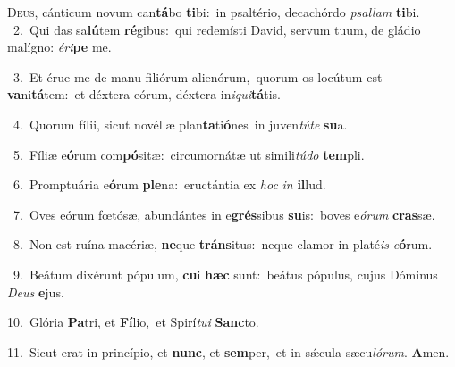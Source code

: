 \lettrine{\initial\textcolor{\initialcolor}{D}}{eus,} cánticum novum can\-\textbf{tá}\-bo \textbf{ti}\-bi:~\star in psaltério, decachórdo \textit{psal}\-\textit{lam} \textbf{ti}\-bi.\\
{\numbfont\textcolor{\numbcolor}{~2.}}~Qui das sa\-\textbf{lú}\-tem \textbf{ré}\-gibus:~\star qui redemísti David, servum tuum, de gládio malígno: \textit{é}\-\textit{ri}\textbf{pe} me.\par
{\numbfont\textcolor{\numbcolor}{~3.}}~Et érue me de manu filiórum alienórum,~\dagger quorum os locútum est \textbf{va}\-ni\-\textbf{tá}\-tem:~\star et déxtera eórum, déxtera in\-\textit{i}\-\textit{qui}\textbf{tá}tis.\par
{\numbfont\textcolor{\numbcolor}{~4.}}~Quorum fílii, sicut novéllæ plan\-\textbf{ta}\-ti\-\textbf{ó}\-nes~\star in juven\-\textit{tú}\-\textit{te} \textbf{su}\-a.\par
{\numbfont\textcolor{\numbcolor}{~5.}}~Fíliæ e\-\textbf{ó}\-rum com\-\textbf{pó}\-sitæ:~\star circumornátæ ut simili\-\textit{tú}\-\textit{do} \textbf{tem}\-pli.\par
{\numbfont\textcolor{\numbcolor}{~6.}}~Promptuária e\-\textbf{ó}\-rum \textbf{ple}\-na:~\star eructántia ex \textit{hoc} \textit{in} \textbf{il}\-lud.\par
{\numbfont\textcolor{\numbcolor}{~7.}}~Oves eórum fœtósæ, abundántes in e\-\textbf{grés}\-sibus \textbf{su}\-is:~\star boves e\-\textit{ó}\-\textit{rum} \textbf{cras}\-sæ.\par
{\numbfont\textcolor{\numbcolor}{~8.}}~Non est ruína macériæ, \textbf{ne}\-que \textbf{tráns}\-itus:~\star neque clamor in platé\textit{is} \textit{e}\-\textbf{ó}rum.\par
{\numbfont\textcolor{\numbcolor}{~9.}}~Beátum dixérunt pópulum, \textbf{cu}\-i \textbf{hæc} sunt:~\star beátus pópulus, cujus Dóminus \textit{De}\-\textit{us} \textbf{e}\-jus.\par
{\numbfont\textcolor{\numbcolor}{10.}}~Glória \textbf{Pa}\-tri, et \textbf{Fí}\-lio,~\star et Spirí\-\textit{tu}\-\textit{i} \textbf{Sanc}\-to.\par
{\numbfont\textcolor{\numbcolor}{11.}}~Sicut erat in princípio, et \textbf{nunc}\-, et \textbf{sem}\-per,~\star et in sǽcula sæcu\-\textit{ló}\-\textit{rum}. \textbf{A}\-men.\par
